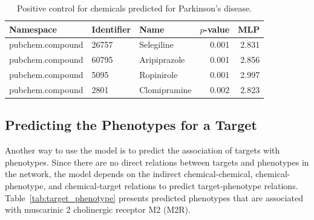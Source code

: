 \begin{table}[!ht]
    \centering
    \begin{tabular}{|l|l|l|r|r|}
        \hline
        \textbf{Namespace} & \textbf{Identifier} & \textbf{Name} & \textbf{$p$-value} & \textbf{MLP} \\
        \hline
        pubchem.compound & 26757 & Selegiline & 0.001 & 2.831 \\
        \hline
        pubchem.compound & 60795 & Aripiprazole & 0.001 & 2.856 \\
        \hline
        pubchem.compound & 5095 & Ropinirole & 0.001 & 2.997 \\
        \hline
        pubchem.compound & 2801 & Clomipramine & 0.002 & 2.823 \\
        \hline
    \end{tabular}
    \captionsetup{justification=centering}
    \caption{Positive control for chemicals predicted for Parkinson's disease.}
    \label{tab:ps_PD}
\end{table}

\subsection{Predicting the Phenotypes for a Target}

Another way to use the model is to predict the association of targets with phenotypes.
Since there are no direct relations between targets and phenotypes in the network, the model depends on the indirect chemical-chemical, chemical-phenotype, and chemical-target relations to predict target-phenotype relations.
Table~\ref{tab:target_phenotype} presents predicted phenotypes that are associated with muscarinic 2 cholinergic receptor M2 (M2R).

